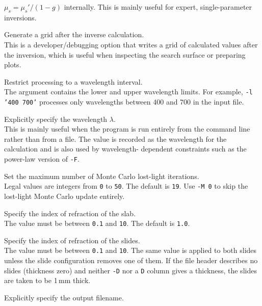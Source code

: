 \documentclass{article}
\begin{document}
\begin{description}
                 $\mu_s=\mu_s'/(1-g)$ internally.  This is mainly useful for
                 expert, single-parameter inversions.
    \item[-J] Generate a grid after the inverse calculation.\\[1mm]
                 This is a developer/debugging option that writes a grid of
                 calculated values after the inversion, which is useful when
                 inspecting the search surface or preparing plots.
    \item[-l '\# \#'] Restrict processing to a wavelength interval.\\[1mm]
                 The argument contains the lower and upper wavelength limits.
                 For example, \texttt{-l '400 700'} processes only wavelengths
                 between 400 and 700 in the input file.
    \item[-L \#] Explicitly specify the wavelength $\lambda$.\\[1mm]
                 This is mainly useful when the program is run entirely from the
                 command line rather than from a file.  The value is recorded as
                 the wavelength for the calculation and is also used by wavelength-
                 dependent constraints such as the power-law version of \texttt{-F}.
    \item[-M \#] Set the maximum number of Monte Carlo lost-light iterations.\\[1mm]
                 Legal values are integers from \texttt{0} to \texttt{50}.  The default is \texttt{19}.
                 Use \texttt{-M 0} to skip the lost-light Monte Carlo update entirely.
    \item[-n \#] Specify the index of refraction of the slab.\\[1mm]
                 The value must be between \texttt{0.1} and \texttt{10}.  The default is \texttt{1.0}.
    \item[-N \#] Specify the index of refraction of the slides.\\[1mm]
                 The value must be between \texttt{0.1} and \texttt{10}.  The same value is applied to
                 both slides unless the slide configuration removes one of them.
                 If the file header describes no slides (thickness zero) and neither \texttt{-D} nor a
                 \texttt{D} column gives a thickness, the slides are taken to be 1\,mm thick.
    \item[-o filename] Explicitly specify the output filename.\\[1mm]

\end{description}
\end{document}
